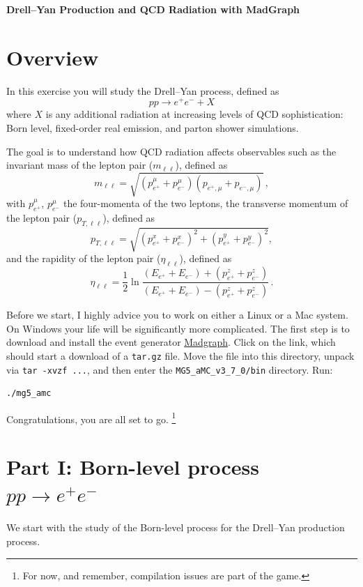 \documentclass{article}
\begin{document}
		
\begin{center}
{\bf \Large Drell--Yan Production and QCD Radiation with MadGraph }\\[0.3cm]			
\end{center}
		
\section*{Overview}

In this exercise you will study the Drell--Yan process, defined as
\[
pp \to e^+ e^- + X
\]
where $X$ is any additional radiation at increasing levels of QCD sophistication:
Born level, fixed-order real emission, and parton shower simulations.

The goal is to understand how QCD radiation affects observables such as
the invariant mass of the lepton pair ($m_{\ell\ell}$), defined as
\[
m_{\ell\ell} = \sqrt{(p_{e^+}^{\mu}+ p_{e^-}^{\mu})(p_{e^+,\mu}+ p_{e^-,\mu})}\,,
\]
with $p_{e^+}^{\mu}$, $p_{e^-}^{\mu}$ the four-momenta of the two leptons, 
the transverse momentum of the lepton pair ($p_{T,\ell\ell}$), defined as
\[
p_{T,\ell\ell} = \sqrt{(p_{e^+}^x+p_{e^-}^x)^2 + (p_{e^+}^y+p_{e^-}^y)^2},
\]
and the rapidity of the lepton pair ($\eta_{\ell\ell}$), defined as
\[
\eta_{\ell\ell}= \frac{1}{2}\ln \frac{(E_{e^+} + E_{e^-})+(p^z_{e^+} + p^z_{e^-})}{(E_{e^+} + E_{e^-})-(p^z_{e^+} + p^z_{e^-})}\,.
\]

Before we start, I highly advice you to work on either a Linux or a Mac system.
%
On Windows your life will be significantly more complicated.
% 
The first step is to download and install the event generator \href{https://launchpad.net/mg5amcnlo/3.0/3.7.x/+download/MG5_aMC_v3.7.0.tar.gz}{Madgraph}. 
%
Click on the link, which should start a download of a \texttt{tar.gz} file. 
%
Move the file into this directory, unpack via \texttt{tar -xvzf ...}, and then enter the \texttt{MG5\_aMC\_v3\_7\_0/bin} directory. 
%
Run: 
\begin{verbatim}
./mg5_amc
\end{verbatim}
Congratulations, you are all set to go.%
%
\footnote{For now, and remember, compilation issues are part of the game.} 

\section*{Part I: Born-level process $pp \to e^+ e^-$}

We start with the study of the Born-level process for the Drell--Yan production process. 
\end{document}
